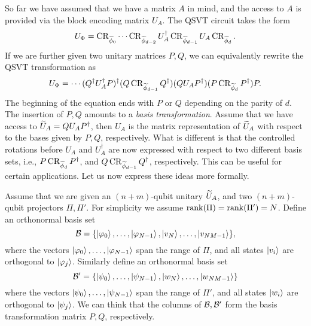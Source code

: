 So far we have assumed that we have a matrix $A$ in mind, and the access to $A$ is provided via the block encoding matrix $U_A$.
The QSVT circuit takes the form
\begin{equation}
U_{\Phi}= \operatorname{CR}_{\widetilde{\phi}_{0}}\cdots \operatorname{CR}_{\widetilde{\phi}_{d-2}}U_A^{\dag}\operatorname{CR}_{\widetilde{\phi}_{d-1}}U_A \operatorname{CR}_{\widetilde{\phi}_d}.
\end{equation}
If we are further given two unitary matrices $P,Q$, we can equivalently rewrite the QSVT transformation as
\begin{equation}
U_{\Phi}= \cdots (Q^{\dag}U_A^{\dag}P)^{\dag}(Q\operatorname{CR}_{\widetilde{\phi}_{d-1}}Q^{\dag})(QU_A P^{\dag})(P\operatorname{CR}_{\widetilde{\phi}_d}P^{\dag})P.
\end{equation}
The beginning of the equation ends with $P$ or $Q$ depending on the parity of $d$. The insertion of $P,Q$ amounts to a \textit{basis transformation}. Assume that we have access to $\widetilde{U}_A=QU_A P^{\dag}$, 
then $U_A$ is the matrix representation of $\widetilde{U}_A$ with respect to the bases given by $P,Q$, respectively.
What is different is that the controlled rotations before $U_A$ and $U_A^{\dag}$ are now expressed with respect to two different basis sets, i.e., $P\operatorname{CR}_{\widetilde{\phi}_d}P^{\dag}$, and $Q\operatorname{CR}_{\widetilde{\phi}_{d-1}}Q^{\dag}$, respectively. 
This can be useful for certain applications. 
Let us now express these ideas more formally.

Assume that we are given an $(n+m)$-qubit unitary $\widetilde{U}_A$, and two $(n+m)$-qubit projectors $\Pi,\Pi'$.  
For simplicity we assume $\operatorname{rank}(\Pi)=\operatorname{rank}(\Pi')=N$. 
Define an orthonormal basis set
\begin{equation}
\mathcal{B}=\{\ket{\varphi_0},\ldots,\ket{\varphi_{N-1}},\ket{v_N},\ldots,\ket{v_{NM-1}}\},
\label{eqn:qsvt_proj_basis_b}
\end{equation}
where the vectors $\ket{\varphi_0},\ldots,\ket{\varphi_{N-1}}$ span the range of $\Pi$, and all states $\ket{v_i}$ are orthogonal to $\ket{\varphi_j}$.
Similarly define an orthonormal basis set
\begin{equation}
\mathcal{B}'=\{\ket{\psi_0},\ldots,\ket{\psi_{N-1}},\ket{w_N},\ldots,\ket{w_{NM-1}}\}
\label{eqn:qsvt_proj_basis_bp}
\end{equation}
where the vectors $\ket{\psi_0},\ldots,\ket{\psi_{N-1}}$ span the range of $\Pi'$, and all states $\ket{w_i}$ are orthogonal to $\ket{\psi_j}$.
We can think that the columns of $\mathcal{B},\mathcal{B}'$ form the basis transformation matrix $P,Q$, respectively.

